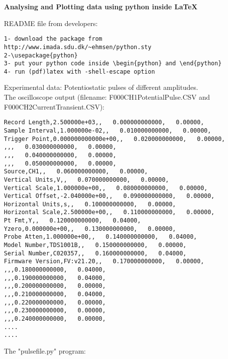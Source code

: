 \documentclass[a4paper]{article}
\begin{document}
\begin{center}
\textbf{Analysing and Plotting data using python inside \LaTeX{}}
\end{center}


README file from developers:
\begin{verbatim}
1- download the package from  http://www.imada.sdu.dk/~ehmsen/python.sty
2-\usepackage{python}
3- put your python code inside \begin{python} and \end{python}
4- run (pdf)latex with -shell-escape option
\end{verbatim}

Experimental data: Potentiostatic pulses of different amplitudes.\\
The oscilloscope output (filename: F000CH1PotentialPulse.CSV and F000CH2CurrentTransient.CSV):\\

\begin{verbatim}
Record Length,2.500000e+03,,   0.000000000000,   0.00000,
Sample Interval,1.000000e-02,,   0.010000000000,   0.00000,
Trigger Point,0.000000000000e+00,,   0.020000000000,   0.00000,
,,,   0.030000000000,   0.00000,
,,,   0.040000000000,   0.00000,
,,,   0.050000000000,   0.00000,
Source,CH1,,   0.060000000000,   0.00000,
Vertical Units,V,,   0.070000000000,   0.00000,
Vertical Scale,1.000000e+00,,   0.080000000000,   0.00000,
Vertical Offset,-2.040000e+00,,   0.090000000000,   0.00000,
Horizontal Units,s,,   0.100000000000,   0.00000,
Horizontal Scale,2.500000e+00,,   0.110000000000,   0.00000,
Pt Fmt,Y,,   0.120000000000,   0.04000,
Yzero,0.000000e+00,,   0.130000000000,   0.00000,
Probe Atten,1.000000e+00,,   0.140000000000,   0.04000,
Model Number,TDS1001B,,   0.150000000000,   0.00000,
Serial Number,C020357,,   0.160000000000,   0.04000,
Firmware Version,FV:v21.20,,   0.170000000000,   0.00000,
,,,0.180000000000,   0.04000,
,,,0.190000000000,   0.04000,
,,,0.200000000000,   0.00000,
,,,0.210000000000,   0.04000,
,,,0.220000000000,   0.00000,
,,,0.230000000000,   0.00000,
,,,0.240000000000,   0.00000,
....
....
\end{verbatim}

The "pulsefile.py" program:\\
\end{document}
